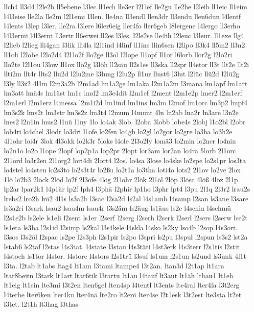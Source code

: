{llch4
ll3d4
l2le2b
ll5ebene
l3lec
ll1ech
lle3er
l2l1ef
lle2gu
lle2he
l2leib
ll1eic
ll1eim
l4l3eise
lle2la
lle2m
l2l1emi
l3len.
lle4na
ll3endl
llen3dr
ll3endu
llen6dun
l4lentf
l4lents
l3lep
l3ler.
lle2ra
l3lere
l6ler6eig
ller4fo
ller6geb
l8lergene
l4lergo
ll3erho
l4l3ermi
l4l3ernt
ll3ertr
ll6erwei
ll2es
l3les.
l2le2se
lle4th
l2leuc
l3leur.
ll1exe
llg4
l2lieb
l2lieg
lli4gan
l3lik
lli4la
l2l1ind
l4linf
ll1ins
llin6sen
l2lipo
ll3k4
ll5m2
ll3n2
ll1ob
l2lobe
l2lo2d4
l2l1o2f
llo2ge
ll3ol
l2lope
ll1opf
ll1or
l6lorb
llor2g
l2lo2ri
llo2te
l2l1ou
l3low
ll1ox
llö2g
l3löh
ll2säu
ll2s1es
ll3ska
ll2spr
ll4stor
ll3t
llt2e
llt2i
llti2m
llt4r
llts2
llu2d
l2lu2me
l3lung
l2lu2p
ll1ur
llust6
l3lut
l2lüc
llü2d
l2lü2g
l3ly
ll3z2
4l1m
l2m3a2b
l2m1ad
lm1a2ge
lm1aka
l2m1a2m
l3mana
lm1apf
lm1art
lm3att
lmä4s
lm1äst
lm1c
lmd2
lm3e4dit
l2m1ef
l2ment
l2m1e2p
lmer2
l2m1erf
l2m1erl
l2m1erz
l4messa
l2m1i2d
lm1ind
lm1ins
lm3m
l2mof
lm1orc
lm3p2
lmpf4
lm3s2k
lms2t
lm3str
lm3s2z
lm3t4
l2mum
l4munt
4ln
ln2ab
lna2r
ln3are
l3n2e
lnes2
l2n1in
lnus2
l1nü
l1ny
1lo
lo4ak
3lob.
l2oba
3lobb
lobe4s
2lobj
l1o2bl
l2obr
lob4ri
lo4chel
3lodr
lo3dri
l1ofe
lo2fen
lo4gh
lo2gl
lo2gor
lo2gre
lo3ha
lo3h2e
4l1ohr
loi4r
3lok
4l3okk
lo2k3r
5loks
l4ole
2l3o2ly
lomä3
lo2min
lo2ner
lo4nin
lo2n1o
lo2o
l1ope
2lopf
lop2p1a
lop2pr
2lopt
lor3am
lor2an
lo4rä
5lorb
2l1orc
2l1ord
lo3r2en
2l1org2
lori4di
2lort4
l2os.
lo4sa
3lose
lo4ske
lo2spe
lo2s1pr
los3ta
lo4stel
lo4steu
lo2s3to
lo2s3t4r
lo2ßu
lo2t1a
lo3tha
loti4o
lots2
2l1ov
lo2ve
2lox
1lö
lö2b3
2löck
2löd
lö2f
2l3öfe
4lög
2l1öhr
2lök
2l1öl
2löp
3lösc
4löß
4löz
2l1p
lp2ar
lpar2k1
l4p1är
lp2f
lph4
l3phä
l2phir
lp1ho
l3phr
lpt4
l3pu
2l1q
2l3r2
lrau2s
lrebs2
lro2h
lrö2
4l1s
ls3a2b
l3sac
l2sa2d
ls2al
l4s1amb
l4samp
l2san
ls3ane
l3sare
ls3a2ri
l3sark
lsau2
lsau4m
lsau4r
l3s2äm
ls2äug
ls1äus
ls2c
l4schin
l4schmü
l2s1e2b
ls2ele
ls1eli
l2sent
ls1er
l2serf
l2serg
l2serh
l2serk
l2serl
l2sers
l2serw
lse2t
ls1eta
ls3ha
l2s1id
l2simp
ls2kal
l3s4kele
l4skla
l4sko
ls2ky
lso4b
l2sop
l4s3ort.
l3sos
l3s2öl
l2spac
ls2pe
l2s3ph
l2s1pir
ls2po
l3spri
ls2pu
l3spul
l2spun
ls3s2
lst2a
lstab6
ls2taf
l2stas
l4s3tat.
l4state
l3stau
l4s3täti
l4st3erk
l4s3terr
l2s1tis
l2stit
l4stoch
ls1tor
l4stor.
l4store
l4stors
l2s1trü
l3suf
ls1um
l2s1un
ls2und
ls3unk
4l1t
l3ta.
l2tab
lt1abs
ltag4
lt1am
l3tami
ltampe4
l3t2an.
ltan3d
l2t1ap
lt1ara
ltar8beitn
l3tark
lt1art
ltar6tik
l3tartu
lt1au
l4tauf
lt3aut
lt1äh
ltbau1
lt1eh
lt1eig
lt1ein
lte3mi
l3t2en
lten6gel
lten4sp
l4tentl
lt3ents
lte4ral
lter4fa
l3t2erg
l4terhe
lter6ken
lter4ku
lter4nä
lte2ro
lt2erö
lter4se
l2t1esk
l3t2est
lte3sta
lt2et
l3tet.
l2t1h
lt3hag
l3thas
}
